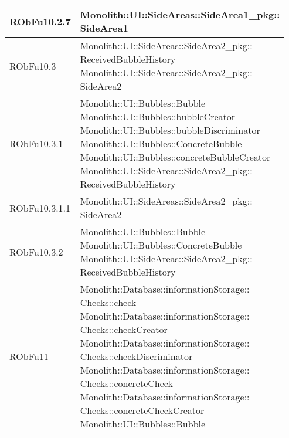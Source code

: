 \begin{center}
\begin{longtable}{|
*{1}{>{\centering\arraybackslash}m{2.5cm}|}
*{1}{>{\centering\arraybackslash}m{7.5cm}|}}
RObFu10.2.7 & \makecell[l]{Monolith::UI::SideAreas::SideArea1\_pkg:: \\ \hfill SideArea1
\\}\\\hline
RObFu10.3 & \makecell[l]{Monolith::UI::SideAreas::SideArea2\_pkg:: \\ \hfill ReceivedBubbleHistory
\\Monolith::UI::SideAreas::SideArea2\_pkg:: \\ \hfill SideArea2
\\}\\\hline
RObFu10.3.1 & \makecell[l]{Monolith::UI::Bubbles::Bubble
\\Monolith::UI::Bubbles::bubbleCreator
\\Monolith::UI::Bubbles::bubbleDiscriminator
\\Monolith::UI::Bubbles::ConcreteBubble
\\Monolith::UI::Bubbles::concreteBubbleCreator
\\Monolith::UI::SideAreas::SideArea2\_pkg:: \\ \hfill ReceivedBubbleHistory
\\}\\\hline
RObFu10.3.1.1 & \makecell[l]{Monolith::UI::SideAreas::SideArea2\_pkg:: \\ \hfill SideArea2
\\}\\\hline
RObFu10.3.2 & \makecell[l]{Monolith::UI::Bubbles::Bubble
\\Monolith::UI::Bubbles::ConcreteBubble
\\Monolith::UI::SideAreas::SideArea2\_pkg:: \\ \hfill ReceivedBubbleHistory
\\}\\\hline
RObFu11 & \makecell[l]{Monolith::Database::informationStorage:: \\ \hfill Checks::check
\\Monolith::Database::informationStorage:: \\ \hfill Checks::checkCreator
\\Monolith::Database::informationStorage:: \\ \hfill Checks::checkDiscriminator
\\Monolith::Database::informationStorage:: \\ \hfill Checks::concreteCheck
\\Monolith::Database::informationStorage:: \\ \hfill Checks::concreteCheckCreator
\\Monolith::UI::Bubbles::Bubble
}
\end{longtable}
\end{center}
